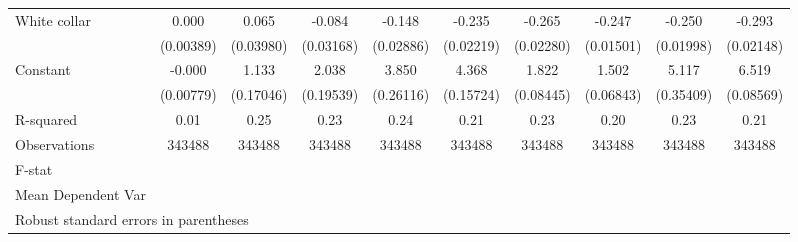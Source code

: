 {\begin{tabular}{l*{9}{c}}
White collar        &       0.000         &       0.065         &      -0.084\sym{**} &      -0.148\sym{***}&      -0.235\sym{***}&      -0.265\sym{***}&      -0.247\sym{***}&      -0.250\sym{***}&      -0.293\sym{***}\\
                    &   (0.00389)         &   (0.03980)         &   (0.03168)         &   (0.02886)         &   (0.02219)         &   (0.02280)         &   (0.01501)         &   (0.01998)         &   (0.02148)         \\
Constant            &      -0.000         &       1.133\sym{***}&       2.038\sym{***}&       3.850\sym{***}&       4.368\sym{***}&       1.822\sym{***}&       1.502\sym{***}&       5.117\sym{***}&       6.519\sym{***}\\
                    &   (0.00779)         &   (0.17046)         &   (0.19539)         &   (0.26116)         &   (0.15724)         &   (0.08445)         &   (0.06843)         &   (0.35409)         &   (0.08569)         \\
\hline
R-squared           &        0.01         &        0.25         &        0.23         &        0.24         &        0.21         &        0.23         &        0.20         &        0.23         &        0.21         \\
Observations        &      343488         &      343488         &      343488         &      343488         &      343488         &      343488         &      343488         &      343488         &      343488         \\
F-stat              &                     &                     &                     &                     &                     &                     &                     &                     &                     \\
Mean Dependent Var  &                     &                     &                     &                     &                     &                     &                     &                     &                     \\
\hline\hline
\multicolumn{10}{l}{\footnotesize Robust standard errors in parentheses}\\
\end{tabular}
}

